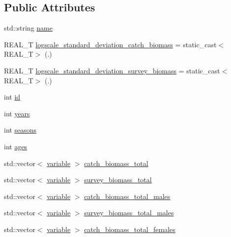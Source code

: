 \subsection*{Public Attributes}
\begin{DoxyCompactItemize}
\item 
std\-::string \hyperlink{structmas_1_1_area_a03c8c1768c367f3251dfca8adffeb780}{name}
\item 
R\-E\-A\-L\-\_\-\-T \hyperlink{structmas_1_1_area_a5cb89e458c67e5fcaa967a8c268f2249}{logscale\-\_\-standard\-\_\-deviation\-\_\-catch\-\_\-biomass} = static\-\_\-cast$<$R\-E\-A\-L\-\_\-\-T$>$ (.)
\item 
R\-E\-A\-L\-\_\-\-T \hyperlink{structmas_1_1_area_aa2ea154a326396d16d67ae84d39ccb3b}{logscale\-\_\-standard\-\_\-deviation\-\_\-survey\-\_\-biomass} = static\-\_\-cast$<$R\-E\-A\-L\-\_\-\-T$>$ (.)
\item 
int \hyperlink{structmas_1_1_area_a43732f02d867125feb9ae56e96114619}{id}
\item 
int \hyperlink{structmas_1_1_area_a2a4e96c3f8817d242c50655f341083c0}{years}
\item 
int \hyperlink{structmas_1_1_area_a45d133239182e8d71e2fd4d1ed1ba04f}{seasons}
\item 
int \hyperlink{structmas_1_1_area_a9eec0d816a288d4c8afeb0e2dffa12df}{ages}
\item 
std\-::vector$<$ \hyperlink{structmas_1_1_area_a3fb53ebc27c5323de15a81fbfbc7c878}{variable} $>$ \hyperlink{structmas_1_1_area_ad9a5d453e1aa68aee982bb93738a24b4}{catch\-\_\-biomass\-\_\-total}
\item 
std\-::vector$<$ \hyperlink{structmas_1_1_area_a3fb53ebc27c5323de15a81fbfbc7c878}{variable} $>$ \hyperlink{structmas_1_1_area_a59bb446f6c932a2255fe8093d731e403}{survey\-\_\-biomass\-\_\-total}
\item 
std\-::vector$<$ \hyperlink{structmas_1_1_area_a3fb53ebc27c5323de15a81fbfbc7c878}{variable} $>$ \hyperlink{structmas_1_1_area_ae68e2cf3d18984ac27d377c1cfeaa0b2}{catch\-\_\-biomass\-\_\-total\-\_\-males}
\item 
std\-::vector$<$ \hyperlink{structmas_1_1_area_a3fb53ebc27c5323de15a81fbfbc7c878}{variable} $>$ \hyperlink{structmas_1_1_area_a87c205e8c7eb39bc4b50492c7707a310}{survey\-\_\-biomass\-\_\-total\-\_\-males}
\item 
std\-::vector$<$ \hyperlink{structmas_1_1_area_a3fb53ebc27c5323de15a81fbfbc7c878}{variable} $>$ \hyperlink{structmas_1_1_area_a65e5b1f37aa45c18d0eefcabd88bf504}{catch\-\_\-biomass\-\_\-total\-\_\-females}

\end{DoxyCompactItemize}
